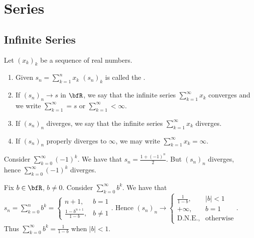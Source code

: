 \chapter{Series}
\vspace{12pt}

\section{Infinite Series}
    \begin{definition}
        Let $(x_k)_k$ be a sequence of real numbers.
            \begin{enumerate}[label = (\arabic*)]
                \item Given $s_n =\sum_{k = 1}^n x_k$ $(s_n)_k$ is called the .
                \item If $(s_n)_n \rightarrow s$ in $\bfR$, we say that the infinite series $\sum_{k=1}^\infty x_k$ converges and we write $\sum_{k = 1}^\infty = s$ or $\sum_{k = 1}^\infty  < \infty$.
                \item If $(s_n)_n$ diverges, we say that the infinite series $\sum_{k =1}^\infty x_k$ diverges.
                \item If $(s_n)_n$ properly diverges to $\infty$, we may write $\sum_{k = 1}^\infty x_k = \infty$.
            \end{enumerate} 
    \end{definition}

    \begin{example}
        Consider $\sum_{k = 0}^\infty (-1)^k$. We have that $s_n = \frac{1 + (-1)^n}{2}$. But $(s_n)_n$ diverges, hence  $\sum_{k = 0}^\infty (-1)^k$ diverges.
    \end{example}

    \begin{example}
        Fix $b \in \bfR$, $b\neq 0$. Consider $\sum_{k = 0}^\infty b^k$. We have that $s_n = \sum_{k = 0}^n b^k = \begin{cases}n+1,&b = 1\\\frac{1-b^{n+1}}{1-b},&b \neq 1 \end{cases}$. Hence $(s_n)_n \rightarrow \begin{cases}\frac{1}{1-b}, & |b| < 1 \\ +\infty, & b = 1 \\ \text{D.N.E.},& \text{otherwise}\end{cases}$. Thus $\sum_{k = 0}^\infty b^k = \frac{1}{1-b}$ when $|b| < 1$.
    \end{example}

